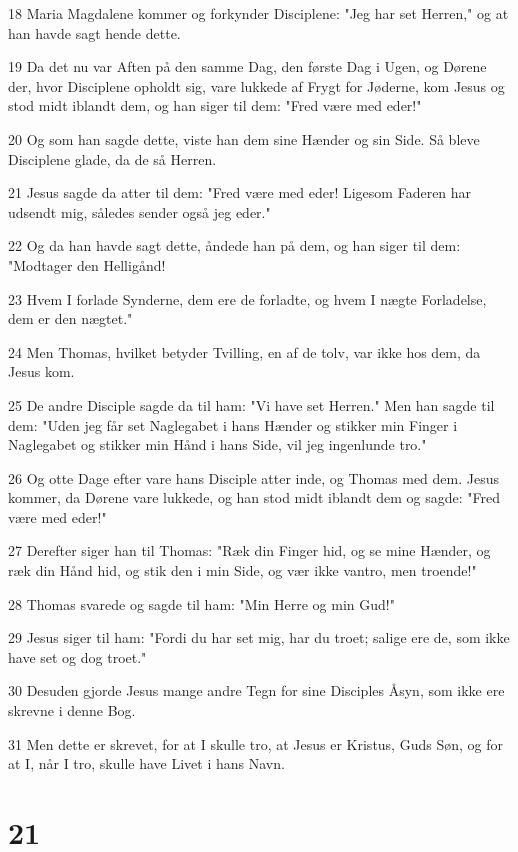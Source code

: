 \par 18 Maria Magdalene kommer og forkynder Disciplene: "Jeg har set Herren," og at han havde sagt hende dette.
\par 19 Da det nu var Aften på den samme Dag, den første Dag i Ugen, og Dørene der, hvor Disciplene opholdt sig, vare lukkede af Frygt for Jøderne, kom Jesus og stod midt iblandt dem, og han siger til dem: "Fred være med eder!"
\par 20 Og som han sagde dette, viste han dem sine Hænder og sin Side. Så bleve Disciplene glade, da de så Herren.
\par 21 Jesus sagde da atter til dem: "Fred være med eder! Ligesom Faderen har udsendt mig, således sender også jeg eder."
\par 22 Og da han havde sagt dette, åndede han på dem, og han siger til dem: "Modtager den Helligånd!
\par 23 Hvem I forlade Synderne, dem ere de forladte, og hvem I nægte Forladelse, dem er den nægtet."
\par 24 Men Thomas, hvilket betyder Tvilling, en af de tolv, var ikke hos dem, da Jesus kom.
\par 25 De andre Disciple sagde da til ham: "Vi have set Herren." Men han sagde til dem: "Uden jeg får set Naglegabet i hans Hænder og stikker min Finger i Naglegabet og stikker min Hånd i hans Side, vil jeg ingenlunde tro."
\par 26 Og otte Dage efter vare hans Disciple atter inde, og Thomas med dem. Jesus kommer, da Dørene vare lukkede, og han stod midt iblandt dem og sagde: "Fred være med eder!"
\par 27 Derefter siger han til Thomas: "Ræk din Finger hid, og se mine Hænder, og ræk din Hånd hid, og stik den i min Side, og vær ikke vantro, men troende!"
\par 28 Thomas svarede og sagde til ham: "Min Herre og min Gud!"
\par 29 Jesus siger til ham: "Fordi du har set mig, har du troet; salige ere de, som ikke have set og dog troet."
\par 30 Desuden gjorde Jesus mange andre Tegn for sine Disciples Åsyn, som ikke ere skrevne i denne Bog.
\par 31 Men dette er skrevet, for at I skulle tro, at Jesus er Kristus, Guds Søn, og for at I, når I tro, skulle have Livet i hans Navn.

\chapter{21}


